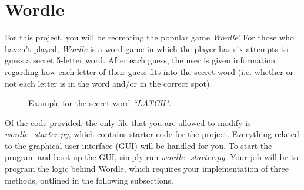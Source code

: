 \documentclass{article}
\begin{document}
\pagestyle{fancy}

\section{Wordle}
\hspace{\parindent}For this project, you will be recreating the popular game \emph{Wordle}! For those who haven't played, \emph{Wordle} is a word game in which the player has six attempts to guess a secret 5-letter word. After each guess, the user is given information regarding how each letter of their guess fits into the secret word (i.e. whether or not each letter is in the word and/or in the correct spot).

\vspace{0.5cm}

\begin{figure}[h!]
    \centering
    \caption{Example for the secret word \emph{``LATCH"}.}
\end{figure}

\vspace{1cm}

Of the code provided, the only file that you are allowed to modify is \emph{wordle\_starter.py}, which contains starter code for the project. Everything related to the graphical user interface (GUI) will be handled for you. To start the program and boot up the GUI, simply run \emph{wordle\_starter.py}. Your job will be to program the logic behind Wordle, which requires your implementation of three methods, outlined in the following subsections.
\end{document}
